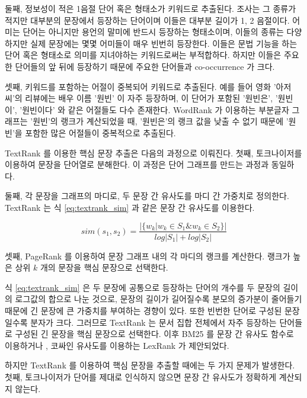 \documentclass[oneside, ko,phd]{snuthesis_utf8_kor}
\begin{document}
둘째, 정보성이 적은 1음절 단어 혹은 형태소가 키워드로 추출된다.
조사는 그 종류가 적지만 대부분의 문장에서 등장하는 단어이며 이들은 대부분 길이가 1, 2 음절이다.
어미는 단어는 아니지만 용언의 말미에 반드시 등장하는 형태소이며, 이들의 종류는 다양하지만 실제 문장에는 몇몇 어미들이 매우 빈번히 등장한다.
이들은 문법 기능을 하는 단어 혹은 형태소로 의미를 지녀야하는 키워드로써는 부적합하다.
하지만 이들은 주요한 단어들의 앞 뒤에 등장하기 때문에 주요한 단어들과 co-occurrence 가 크다.

셋째, 키워드를 포함하는 어절이 중복되어 키워드로 추출된다.
예를 들어 영화 '아저씨'의 리뷰에는 배우 이름 '원빈' 이 자주 등장하며, 이 단어가 포함된 '원빈은', '원빈이', '원빈이다' 와 같은 어절들도 다수 존재한다.
WordRank 가 이용하는 부분글자 그래프는 '원빈'의 랭크가 계산되었을 때, '원빈은'의 랭크 값을 낮출 수 없기 때문에 '원빈'을 포함한 많은 어절들이 중복적으로 추출된다.

TextRank 를 이용한 핵심 문장 추출은 다음의 과정으로 이뤄진다.
첫째, 토크나이저를 이용하여 문장을 단어열로 분해한다.
이 과정은 단어 그래프를 만드는 과정과 동일하다.

둘째, 각 문장을 그래프의 마디로, 두 문장 간 유사도를 마디 간 가중치로 정의한다.
TextRank 는 식 \ref{eq:textrank_sim} 과 같은 문장 간 유사도를 이용한다.

\begin{equation}
\label{eq:textrank_sim}
sim(s_1, s_2) = \frac{\vert \{ w_k \vert w_k \in S_1 \& w_k \in S_2 \} \vert}{log \vert S_1 \vert + log \vert S_2 \vert}
\end{equation}

셋째, PageRank \cite{ilprints422} 를 이용하여 문장 그래프 내의 각 마디의 랭크를 계산한다.
랭크가 높은 상위 $k$ 개의 문장을 핵심 문장으로 선택한다.

식 \ref{eq:textrank_sim} 은 두 문장에 공통으로 등장하는 단어의 개수를 두 문장의 길이의 로그값의 합으로 나눈 것으로, 문장의 길이가 길어질수록 분모의 증가분이 줄어들기 때문에 긴 문장에 큰 가중치를 부여하는 경향이 있다.
또한 빈번한 단어로 구성된 문장일수록 분자가 크다.
그러므로 TextRank 는 문서 집합 전체에서 자주 등장하는 단어들로 구성된 긴 문장을 핵심 문장으로 선택한다.
이후 BM25 \cite{robertson2009probabilistic} 를 문장 간 유사도 함수로 이용하거나 \cite{barrios2016variations}, 코싸인 유사도를 이용하는 LexRank \cite{erkan2004lexrank} 가 제안되었다.

하지만 TextRank 를 이용하여 핵심 문장을 추출할 때에는 두 가지 문제가 발생한다.
첫째, 토크나이저가 단어를 제대로 인식하지 않으면 문장 간 유사도가 정확하게 계산되지 않는다.
\end{document}

